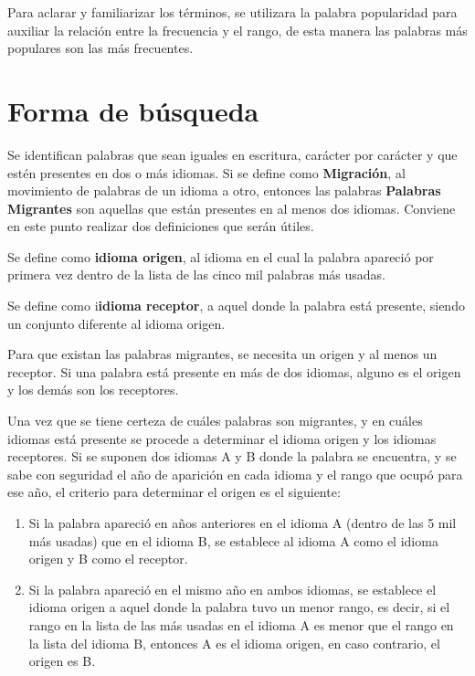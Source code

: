 Para aclarar y familiarizar los términos, se utilizara la palabra popularidad para auxiliar la relación entre la frecuencia y el rango, de esta manera las palabras más populares son las más frecuentes.



\section{Forma de búsqueda}

Se identifican palabras que sean iguales en escritura, carácter por carácter y que estén presentes en dos o más idiomas.  Si se define como  \textbf{Migración}, al movimiento de palabras de un idioma a otro, entonces las palabras \textbf{Palabras Migrantes}  son aquellas que están presentes en al menos dos idiomas.  Conviene en este punto realizar dos definiciones que serán útiles.

\hfill \break

Se define como  \textbf{idioma origen}, al idioma en el cual la palabra apareció por primera vez dentro de la lista de las cinco mil palabras más usadas.  

\hfill \break 

Se define como i\textbf{idioma receptor}, a  aquel donde la palabra está presente, siendo un conjunto diferente al idioma origen.  

\hfill \break

Para que existan las palabras migrantes, se necesita un origen y al menos un receptor. Si una palabra está presente en más de dos idiomas, alguno es el origen y los demás son los receptores. 

Una vez que se tiene certeza de cuáles palabras son migrantes, y en cuáles idiomas está presente se procede a determinar el idioma origen y los idiomas receptores.   Si se suponen dos idiomas A y B donde la palabra se encuentra, y se sabe con seguridad el año de aparición en cada idioma y el rango que ocupó para ese año,  el criterio para determinar el origen es el siguiente: 


\begin{enumerate}
	
	\item  Si la palabra apareció en años anteriores en el idioma A (dentro de las 5 mil más usadas) que en el idioma B, se establece al idioma A como el idioma origen y B como el receptor.
	
	\item Si la palabra apareció en el mismo año en ambos idiomas, se establece el idioma origen a aquel donde la palabra tuvo un menor rango, es decir, si el rango en la lista de las más usadas en el idioma A es menor que el rango en la lista del idioma B, entonces A es el idioma origen, en caso contrario, el origen es B.
\end{enumerate}

